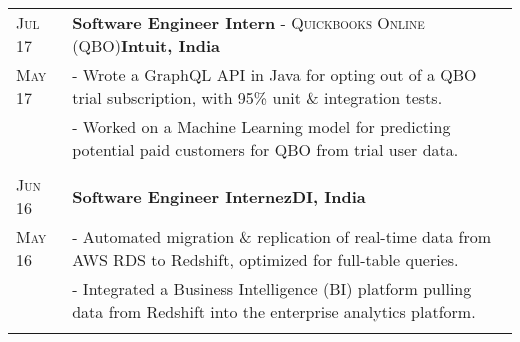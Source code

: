 \documentclass[a4paper,10pt]{extarticle} %
\begin{document}
\begin{tabularx}{\linewidth}{ l | X }
\textsc{Jul 17} & \textbf{Software Engineer Intern} \textsc{- Quickbooks Online (QBO)}\hfill\textbf{Intuit, India}\\
\textsc{May 17}& {- Wrote a GraphQL API in Java for opting out of a QBO trial subscription, with 95\% unit \& integration tests.}\\
& {- Worked on a Machine Learning model for predicting potential paid customers for QBO from trial user data.}\\
\multicolumn{2}{c}{} \\

\textsc{Jun 16} & \textbf{Software Engineer Intern}\hfill\textbf{ezDI, India}\\
\textsc{May 16}& {- Automated migration \& replication of real-time data from AWS RDS to Redshift, optimized for full-table queries.}\\
& {- Integrated a Business Intelligence (BI) platform pulling data from Redshift into the enterprise analytics platform.}\\
\multicolumn{2}{c}{} \\

\end{tabularx}

\end{document}
